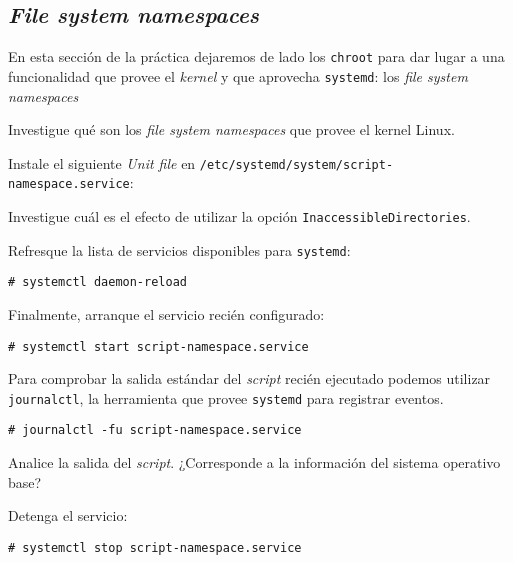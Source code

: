 \subsection{\textit{File system namespaces}}
En esta sección de la práctica dejaremos de lado los \texttt{chroot} para
dar lugar a una funcionalidad que provee el \textit{kernel} y que aprovecha
\texttt{systemd}: los \textit{file system namespaces}

\begin{questions}
  \question Investigue qué son los \textit{file system namespaces} que
  provee el kernel Linux.

  \question Instale el siguiente \textit{Unit file} en
  \texttt{/etc/systemd/system/script-namespace.service}:

  

  \question Investigue cuál es el efecto de utilizar la opción
  \texttt{InaccessibleDirectories}.

    \question Refresque la lista de servicios disponibles para
  \texttt{systemd}:
  \begin{verbatim}
# systemctl daemon-reload
\end{verbatim}

  \question Finalmente, arranque el servicio recién configurado:
\begin{verbatim}
# systemctl start script-namespace.service
\end{verbatim}

    \question Para comprobar la salida estándar del \textit{script} recién
    ejecutado podemos utilizar \texttt{journalctl}, la herramienta que
    provee \texttt{systemd} para registrar eventos.
\begin{verbatim}
# journalctl -fu script-namespace.service
\end{verbatim}

    Analice la salida del \textit{script}. ¿Corresponde a la información
    del sistema operativo base?

    \question Detenga el servicio:
\begin{verbatim}
# systemctl stop script-namespace.service
\end{verbatim}
    
\end{questions}

